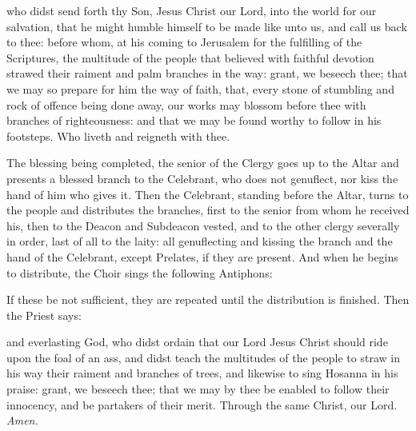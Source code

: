 {} who didst send forth thy Son, Jesus Christ our Lord, into the world for our salvation, that he might humble himself to be made like unto us, and call us back to thee: before whom, at his coming to Jerusalem for the fulfilling of the Scriptures, the multitude of the people that believed with faithful devotion strawed their raiment and palm branches in the way: grant, we beseech thee; that we may so prepare for him the way of faith, that, every stone of stumbling and rock of offence being done away, our works may blossom before thee with branches of righteousness: and that we may be found worthy to follow in his footsteps. Who liveth and reigneth with thee.
\begin{rubric}
    The blessing being completed, the senior of the Clergy goes up to the Altar and presents a blessed branch to the Celebrant, who does not genuflect, nor kiss the hand of him who gives it. Then the Celebrant, standing before the Altar, turns to the people and distributes the branches, first to the senior from whom he received his, then to the Deacon and Subdeacon vested, and to the other clergy severally in order, last of all to the laity: all genuflecting and kissing the branch and the hand of the Celebrant, except Prelates, if they are present. And when he begins to distribute, the Choir sings the following Antiphons:
\end{rubric}\par
{}\par
{}
\begin{rubric}
    If these be not sufficient, they are repeated until the distribution is finished. Then the Priest says:
\end{rubric}
{} and everlasting God, who didst ordain that our Lord Jesus Christ should ride upon the foal of an ass, and didst teach the multitudes of the people to straw in his way their raiment and branches of trees, and likewise to sing Hosanna in his praise: grant, we beseech thee; that we may by thee be enabled to follow their innocency, and be partakers of their merit. Through the same Christ, our Lord. \textit{Amen.}
